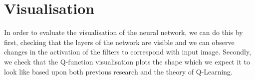 \section{Visualisation}
In order to evaluate the visualisation of the neural network, we can do this by first, checking that the layers of the network are visible and we can observe changes in the activation of the filters to correspond with input image. Secondly, we check that the Q-function visualisation plots the shape which we expect it to look like based upon both previous research and the theory of Q-Learning.

